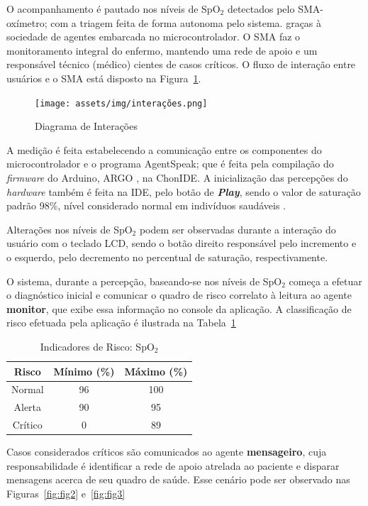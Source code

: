 O acompanhamento é pautado nos níveis de SpO$_2$ detectados pelo SMA-oxímetro; com a triagem feita de forma autonoma pelo sistema. graças à sociedade de agentes embarcada no microcontrolador. 
O SMA faz o monitoramento integral do enfermo, mantendo uma rede de apoio e um responsável técnico (médico) cientes de casos críticos. 
O fluxo de interação entre usuários e o SMA está disposto na Figura~\ref{fig:fig1}.

\begin{figure}[H]
  \centering
  \texttt{[image: assets/img/interações.png]}
  \caption{Diagrama de Interações}
  \label{fig:fig1}
\end{figure}

A medição é feita estabelecendo a comunicação entre os componentes do microcontrolador e o programa AgentSpeak; que é feita pela compilação do \textit{firmware} do Arduino, ARGO \cite{ArgoAgent}, na ChonIDE. A inicialização das percepções do \textit{hardware} também é feita na IDE, pelo botão de \textbf{\textit{Play}}, sendo o valor de saturação padrão 98\%, nível considerado normal em indivíduos saudáveis \cite{collins2015relating}.

Alterações nos níveis de SpO$_2$ podem ser observadas durante a interação do usuário com o teclado LCD, sendo o botão direito responsável pelo incremento e o esquerdo, pelo decremento no percentual de saturação, respectivamente.

O sistema, durante a percepção, baseando-se nos níveis de SpO$_2$ começa a efetuar o diagnóstico inicial e comunicar o quadro de risco correlato à leitura ao agente \textbf{monitor}, que exibe essa informação no console da aplicação. A classificação de risco efetuada pela aplicação é ilustrada na  Tabela~\ref{tab:tabela1}


\begin{table}[ht]
    \centering
    \begin{tabular}{|c|c|c|}
        \hline
        \textbf{Risco} & \textbf{Mínimo (\%)} & \textbf{Máximo (\%)} \\
        \hline
        Normal & 96 & 100 \\ 
        \hline
        Alerta & 90 & 95 \\ 
        \hline
        Crítico & 0 & 89 \\ 
        \hline
    \end{tabular}
    \caption{Indicadores de Risco: SpO$_2$}
    \label{tab:tabela1}
\end{table}

Casos considerados críticos são comunicados ao agente \textbf{mensageiro}, cuja responsabilidade é identificar a rede de apoio atrelada ao paciente e disparar mensagens acerca de seu quadro de saúde. Esse cenário pode ser observado nas Figuras~\ref{fig:fig2} e~\ref{fig:fig3}

